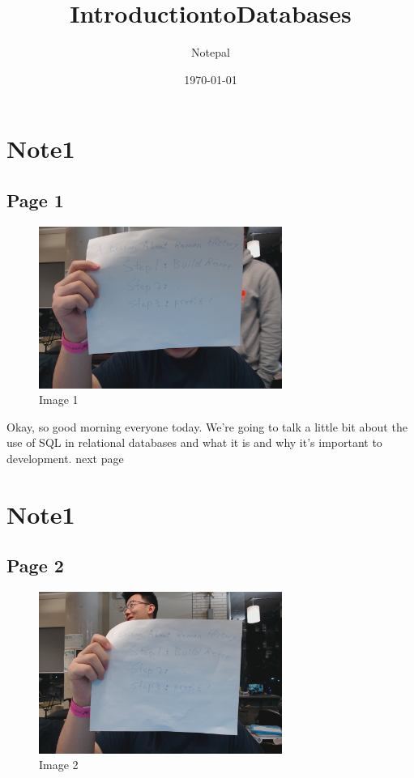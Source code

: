 \documentclass{article}%
\title{IntroductiontoDatabases}%
\author{Notepal}%
\date{\today}%
\begin{document}
%
\normalsize%
\maketitle%
\section{Note1}%
\label{sec:Note1}%
\subsection{Page 1}%
\label{subsec:Page 1}%


\begin{figure}[h!]%
\centering%
\includegraphics[width=300px]{../Notes/IntroductiontoDatabases/Note1/image1.jpg}%
\caption{Image 1}%
\end{figure}

%
Okay, so good morning everyone today. We're going to talk a little bit about the use of SQL in relational databases and what it is and why it's important to development. \newline%
 next page \newline%

%
\section{Note1}%
\label{sec:Note1}%
\subsection{Page 2}%
\label{subsec:Page 2}%


\begin{figure}[h!]%
\centering%
\includegraphics[width=300px]{../Notes/IntroductiontoDatabases/Note1/image2.jpg}%
\caption{Image 2}%
\end{figure}
\end{document}
